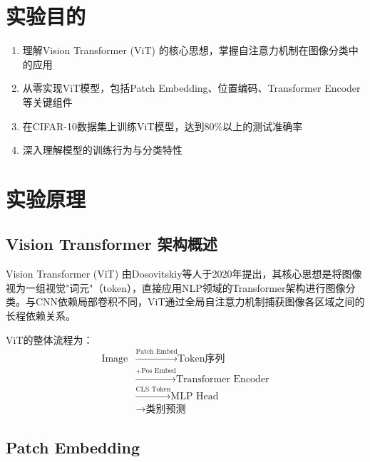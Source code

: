 \documentclass[12pt,a4paper]{article}
\begin{document}
\newpage
\tableofcontents
\newpage

\section{实验目的}

\begin{enumerate}
    \item 理解Vision Transformer (ViT) 的核心思想，掌握自注意力机制在图像分类中的应用
    \item 从零实现ViT模型，包括Patch Embedding、位置编码、Transformer Encoder等关键组件
    \item 在CIFAR-10数据集上训练ViT模型，达到80\%以上的测试准确率
    \item 深入理解模型的训练行为与分类特性
\end{enumerate}

\section{实验原理}

\subsection{Vision Transformer 架构概述}

Vision Transformer (ViT) 由Dosovitskiy等人于2020年提出\cite{dosovitskiy2020image}，其核心思想是将图像视为一组视觉"词元"（token），直接应用NLP领域的Transformer架构进行图像分类。与CNN依赖局部卷积不同，ViT通过全局自注意力机制捕获图像各区域之间的长程依赖关系。

ViT的整体流程为：
\begin{equation}
\begin{aligned}
\text{Image} &\xrightarrow{\text{Patch Embed}} \text{Token序列} \\
             &\xrightarrow{+\text{Pos Embed}} \text{Transformer Encoder} \\
             &\xrightarrow{\text{CLS Token}} \text{MLP Head} \\
             &\to \text{类别预测}
\end{aligned}
\end{equation}

\subsection{Patch Embedding}
\end{document}
